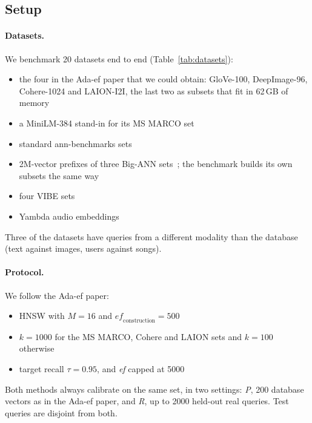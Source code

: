 \documentclass[twocolumn]{svjour3}
\newcommand{\ef}{\textit{ef}}
\begin{document}
\subsection{Setup}

\paragraph{Datasets.}
We benchmark 20 datasets end to end (Table~\ref{tab:datasets}):
\begin{itemize}
\item the four in the Ada-ef paper that we could obtain: GloVe-100, DeepImage-96, Cohere-1024 and
  LAION-I2I, the last two as subsets that fit in 62\,GB of memory
\item a MiniLM-384 stand-in for its MS MARCO set
\item standard ann-benchmarks sets~\cite{aumuller2020annbenchmarks}
\item 2M-vector prefixes of three Big-ANN sets~\cite{simhadri2022bigann}; the benchmark builds its own
  subsets the same way
\item four VIBE sets~\cite{jaasaari2025vibe}
\item Yambda audio embeddings~\cite{ploshkin2025yambda}
\end{itemize}
Three of the datasets have queries from a different modality than the database (text against images,
users against songs).

\paragraph{Protocol.}
We follow the Ada-ef paper:
\begin{itemize}
\item HNSW with $M = 16$ and $\mathit{ef}_{\mathrm{construction}} = 500$
\item $k = 1000$ for the MS MARCO, Cohere and LAION sets and $k = 100$ otherwise
\item target recall $\tau = 0.95$, and \ef{} capped at 5000
\end{itemize}
Both methods always calibrate on the same set, in two settings: \emph{P}, 200 database vectors as in
the Ada-ef paper, and \emph{R}, up to 2000 held-out real queries. Test queries are disjoint from
both.
\end{document}
